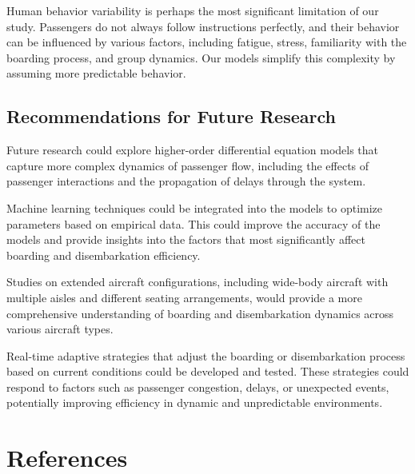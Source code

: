 \documentclass[12pt,a4paper]{article}
\begin{document}
Human behavior variability is perhaps the most significant limitation of our study. Passengers do not always follow instructions perfectly, and their behavior can be influenced by various factors, including fatigue, stress, familiarity with the boarding process, and group dynamics. Our models simplify this complexity by assuming more predictable behavior.

\subsection{Recommendations for Future Research}

Future research could explore higher-order differential equation models that capture more complex dynamics of passenger flow, including the effects of passenger interactions and the propagation of delays through the system.

Machine learning techniques could be integrated into the models to optimize parameters based on empirical data. This could improve the accuracy of the models and provide insights into the factors that most significantly affect boarding and disembarkation efficiency.

Studies on extended aircraft configurations, including wide-body aircraft with multiple aisles and different seating arrangements, would provide a more comprehensive understanding of boarding and disembarkation dynamics across various aircraft types.

Real-time adaptive strategies that adjust the boarding or disembarkation process based on current conditions could be developed and tested. These strategies could respond to factors such as passenger congestion, delays, or unexpected events, potentially improving efficiency in dynamic and unpredictable environments.

\section{References}
\end{document}

